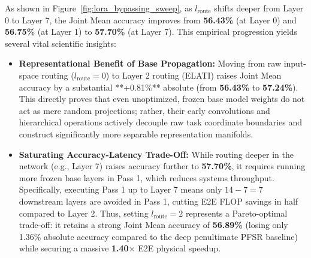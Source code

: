 As shown in Figure~\ref{fig:lora_bypassing_sweep}, as $l_{\text{route}}$ shifts deeper from Layer 0 to Layer 7, the Joint Mean accuracy improves from \textbf{56.43\%} (at Layer 0) and \textbf{56.75\%} (at Layer 1) to \textbf{57.70\%} (at Layer 7). This empirical progression yields several vital scientific insights:
\begin{itemize}
    \item \textbf{Representational Benefit of Base Propagation:} Moving from raw input-space routing ($l_{\text{route}} = 0$) to Layer 2 routing (ELATI) raises Joint Mean accuracy by a substantial **+0.81\%** absolute (from \textbf{56.43\%} to \textbf{57.24\%}). This directly proves that even unoptimized, frozen base model weights do not act as mere random projections; rather, their early convolutions and hierarchical operations actively decouple raw task coordinate boundaries and construct significantly more separable representation manifolds.
    \item \textbf{Saturating Accuracy-Latency Trade-Off:} While routing deeper in the network (e.g., Layer 7) raises accuracy further to \textbf{57.70\%}, it requires running more frozen base layers in Pass 1, which reduces systems throughput. Specifically, executing Pass 1 up to Layer 7 means only $14 - 7 = 7$ downstream layers are avoided in Pass 1, cutting E2E FLOP savings in half compared to Layer 2. Thus, setting $l_{\text{route}} = 2$ represents a Pareto-optimal trade-off: it retains a strong Joint Mean accuracy of \textbf{56.89\%} (losing only 1.36\% absolute accuracy compared to the deep penultimate PFSR baseline) while securing a massive \textbf{1.40$\times$} E2E physical speedup.
\end{itemize}

